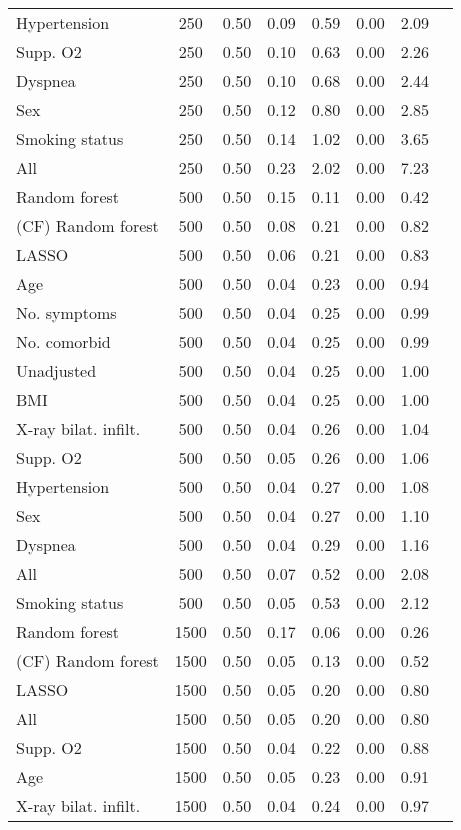 \documentclass{article}
\begin{document}
{\begin{longtable}{lccccccc}
Hypertension & 250 & 0.50 & 0.09 & 0.59 & 0.00 & 2.09 \\ 
Supp. O2 & 250 & 0.50 & 0.10 & 0.63 & 0.00 & 2.26 \\ 
Dyspnea & 250 & 0.50 & 0.10 & 0.68 & 0.00 & 2.44 \\ 
Sex & 250 & 0.50 & 0.12 & 0.80 & 0.00 & 2.85 \\ 
Smoking status & 250 & 0.50 & 0.14 & 1.02 & 0.00 & 3.65 \\ 
All & 250 & 0.50 & 0.23 & 2.02 & 0.00 & 7.23 \\ \midrule() 
Random forest & 500 & 0.50 & 0.15 & 0.11 & 0.00 & 0.42 \\ 
(CF) Random forest & 500 & 0.50 & 0.08 & 0.21 & 0.00 & 0.82 \\ 
LASSO & 500 & 0.50 & 0.06 & 0.21 & 0.00 & 0.83 \\ 
Age & 500 & 0.50 & 0.04 & 0.23 & 0.00 & 0.94 \\ 
No. symptoms & 500 & 0.50 & 0.04 & 0.25 & 0.00 & 0.99 \\ 
No. comorbid & 500 & 0.50 & 0.04 & 0.25 & 0.00 & 0.99 \\ 
Unadjusted & 500 & 0.50 & 0.04 & 0.25 & 0.00 & 1.00 \\ 
BMI & 500 & 0.50 & 0.04 & 0.25 & 0.00 & 1.00 \\ 
X-ray bilat. infilt. & 500 & 0.50 & 0.04 & 0.26 & 0.00 & 1.04 \\ 
Supp. O2 & 500 & 0.50 & 0.05 & 0.26 & 0.00 & 1.06 \\ 
Hypertension & 500 & 0.50 & 0.04 & 0.27 & 0.00 & 1.08 \\ 
Sex & 500 & 0.50 & 0.04 & 0.27 & 0.00 & 1.10 \\ 
Dyspnea & 500 & 0.50 & 0.04 & 0.29 & 0.00 & 1.16 \\ 
All & 500 & 0.50 & 0.07 & 0.52 & 0.00 & 2.08 \\ 
Smoking status & 500 & 0.50 & 0.05 & 0.53 & 0.00 & 2.12 \\ \midrule() 
Random forest & 1500 & 0.50 & 0.17 & 0.06 & 0.00 & 0.26 \\ 
(CF) Random forest & 1500 & 0.50 & 0.05 & 0.13 & 0.00 & 0.52 \\ 
LASSO & 1500 & 0.50 & 0.05 & 0.20 & 0.00 & 0.80 \\ 
All & 1500 & 0.50 & 0.05 & 0.20 & 0.00 & 0.80 \\ 
Supp. O2 & 1500 & 0.50 & 0.04 & 0.22 & 0.00 & 0.88 \\ 
Age & 1500 & 0.50 & 0.05 & 0.23 & 0.00 & 0.91 \\ 
X-ray bilat. infilt. & 1500 & 0.50 & 0.04 & 0.24 & 0.00 & 0.97 \\ 

\end{longtable}}
\end{document}
